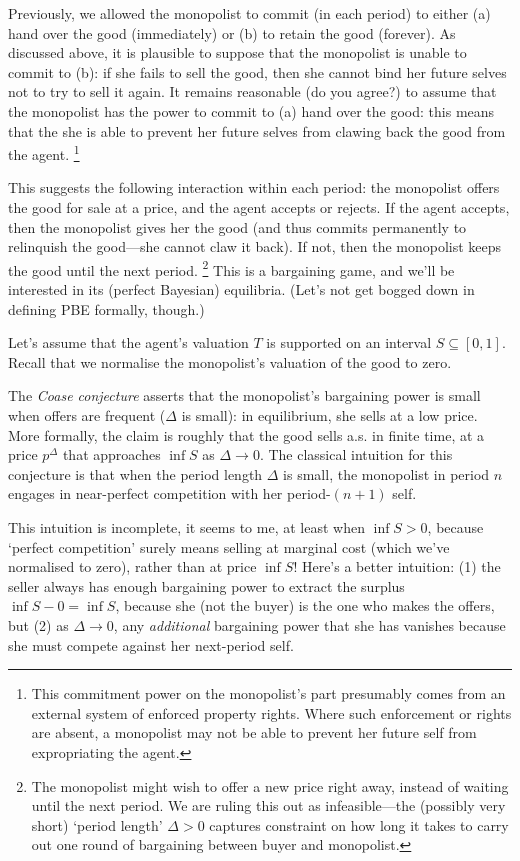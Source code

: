 Previously, we allowed the monopolist to commit (in each period) to either (a) hand over the good (immediately) or (b) to retain the good (forever).
As discussed above, it is plausible to suppose that the monopolist is unable to commit to (b): if she fails to sell the good, then she cannot bind her future selves not to try to sell it again.
It remains reasonable (do you agree?) to assume that the monopolist has the power to commit to (a) hand over the good: this means that the she is able to prevent her future selves from clawing back the good from the agent.%
	\footnote{This commitment power on the monopolist's part presumably comes from an external system of enforced property rights. Where such enforcement or rights are absent, a monopolist may not be able to prevent her future self from expropriating the agent.}

This suggests the following interaction within each period: the monopolist offers the good for sale at a price, and the agent accepts or rejects.
If the agent accepts, then the monopolist gives her the good (and thus commits permanently to relinquish the good---she cannot claw it back).
If not, then the monopolist keeps the good until the next period.%
	\footnote{The monopolist might wish to offer a new price right away, instead of waiting until the next period. We are ruling this out as infeasible---the (possibly very short) `period length' $\Delta>0$ captures constraint on how long it takes to carry out one round of bargaining between buyer and monopolist.}
This is a bargaining game, and we'll be interested in its (perfect Bayesian) equilibria. (Let's not get bogged down in defining PBE formally, though.)

Let's assume that the agent's valuation $T$ is supported on an interval $S \subseteq [0,1]$. Recall that we normalise the monopolist's valuation of the good to zero.

The \emph{Coase conjecture} asserts that the monopolist's bargaining power is small when offers are frequent ($\Delta$ is small): in equilibrium, she sells at a low price.
More formally, the claim is roughly that the good sells a.s. in finite time,
at a price $p^\Delta$ that approaches $\inf S$ as $\Delta \to 0$.
The classical intuition for this conjecture is that when the period length $\Delta$ is small, the monopolist in period $n$ engages in near-perfect competition with her period-$(n+1)$ self.

This intuition is incomplete, it seems to me, at least when $\inf S > 0$, because `perfect competition' surely means selling at marginal cost (which we've normalised to zero), rather than at price $\inf S$!
Here's a better intuition: (1) the seller always has enough bargaining power to extract the surplus $\inf S - 0 = \inf S$, because she (not the buyer) is the one who makes the offers, but (2) as $\Delta \to 0$, any \emph{additional} bargaining power that she has vanishes because she must compete against her next-period self.

